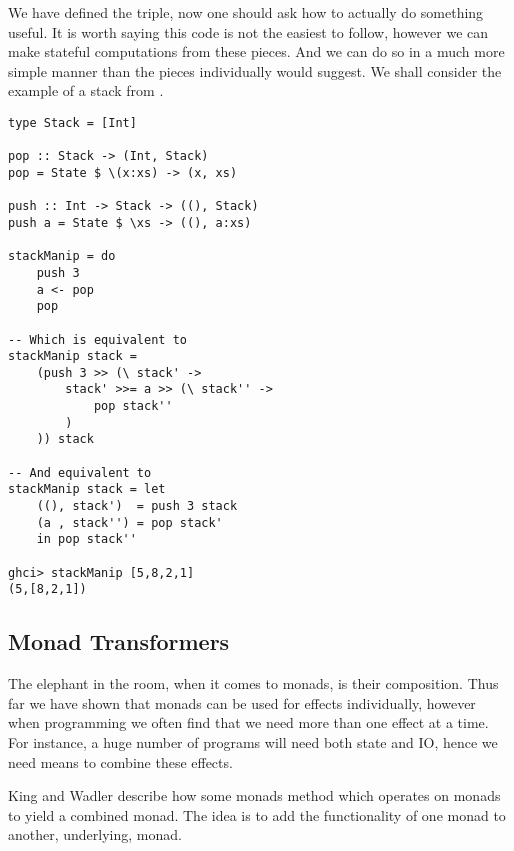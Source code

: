 We have defined the triple,
now one should ask how to actually do something useful.
It is worth saying this code is not the easiest to follow,
however we can make stateful computations from these pieces.
And we can do so in a much more simple manner than the
pieces individually would suggest.
We shall consider the example of a stack from \cite{lipovaca2011learn}.
\begin{verbatim}
type Stack = [Int]

pop :: Stack -> (Int, Stack)
pop = State $ \(x:xs) -> (x, xs)

push :: Int -> Stack -> ((), Stack)
push a = State $ \xs -> ((), a:xs)

stackManip = do
    push 3
    a <- pop
    pop

-- Which is equivalent to
stackManip stack =
    (push 3 >> (\ stack' ->
        stack' >>= a >> (\ stack'' ->
            pop stack''
        )
    )) stack

-- And equivalent to
stackManip stack = let
    ((), stack')  = push 3 stack
    (a , stack'') = pop stack'
    in pop stack''

ghci> stackManip [5,8,2,1]
(5,[8,2,1])
\end{verbatim}

\subsection{Monad Transformers}
The elephant in the room, when it comes to monads, is their composition.
Thus far we have shown that monads can be used for effects individually,
however when programming we often find that we need more than one effect
at a time.
For instance, a huge number of programs will need both state and IO,
hence we need means to combine these effects.

King and Wadler \cite{king1993combining}
describe how some monads method which operates on monads to yield a combined monad.
The idea is to add the functionality of one monad to another, underlying, monad.

